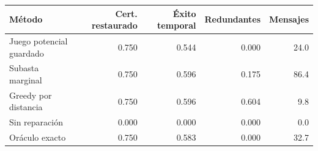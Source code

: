 \begin{tabular}{lrrrr}
\toprule
Método & Cert. restaurado & Éxito temporal & Redundantes & Mensajes \\
\midrule
Juego potencial guardado & 0.750 & 0.544 & 0.000 & 24.0 \\
Subasta marginal & 0.750 & 0.596 & 0.175 & 86.4 \\
Greedy por distancia & 0.750 & 0.596 & 0.604 & 9.8 \\
Sin reparación & 0.000 & 0.000 & 0.000 & 0.0 \\
Oráculo exacto & 0.750 & 0.583 & 0.000 & 32.7 \\
\bottomrule
\end{tabular}
